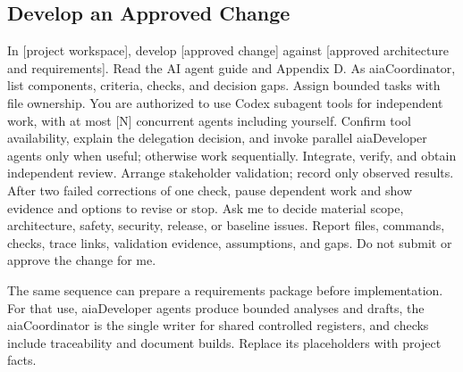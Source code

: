 \begin{samepage}
\subsection{Develop an Approved Change}

\begingroup\ttfamily\raggedright
\noindent In [project workspace], develop [approved change] against [approved architecture and requirements]. Read the AI agent guide and Appendix D. As aiaCoordinator, list components, criteria, checks, and decision gaps. Assign bounded tasks with file ownership. You are authorized to use Codex subagent tools for independent work, with at most [N] concurrent agents including yourself. Confirm tool availability, explain the delegation decision, and invoke parallel aiaDeveloper agents only when useful; otherwise work sequentially. Integrate, verify, and obtain independent review. Arrange stakeholder validation; record only observed results. After two failed corrections of one check, pause dependent work and show evidence and options to revise or stop. Ask me to decide material scope, architecture, safety, security, release, or baseline issues. Report files, commands, checks, trace links, validation evidence, assumptions, and gaps. Do not submit or approve the change for me.\par
\endgroup

\end{samepage}

The same sequence can prepare a requirements package before implementation.
For that use, aiaDeveloper agents produce bounded analyses and drafts, the aiaCoordinator
is the single writer for shared controlled registers, and checks include
traceability and document builds. Replace its placeholders with project facts.

